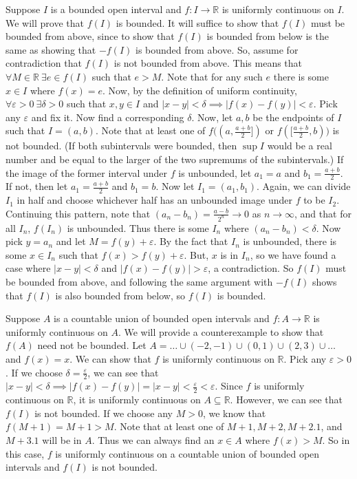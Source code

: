 \documentclass[11pt]{article}
\newcommand{\R}{\mathbb{R}}
\begin{document}
Suppose $I$ is a bounded open interval and $f:I\to\R$ is uniformly
continuous on $I$. We will prove that $f(I)$ is bounded. It will
suffice to show that $f(I)$ must be bounded from above, since to show
that $f(I)$ is bounded from below is the same as showing that
$-f(I)$ is bounded from above.
So, assume for contradiction that $f(I)$ is not bounded from above.
This means that $\forall M\in\R\ \exists e\in f(I)$ such that $e>M$.
Note that for any such $e$ there is some $x\in I$ where $f(x)=e$.
Now, by the definition of uniform continuity,
$\forall\varepsilon>0\ \exists\delta>0$ such that
$x,y\in I$ and $|x-y|<\delta\implies|f(x)-f(y)|<\varepsilon$.
Pick any $\varepsilon$ and fix it. Now find a corresponding $\delta$.
Now, let $a,b$ be the endpoints of $I$ such that $I=(a,b)$. Note that
at least one of $f((a,\frac{a+b}{2}])$ or $f([\frac{a+b}{2},b))$ is
not bounded. (If both subintervals were bounded, then $\sup I$ would
be a real number
and be equal to the larger of the two supremums of the subintervals.)
If the image of the former interval under $f$ is unbounded,
let $a_1=a$ and $b_1=\frac{a+b}{2}$.
If not, then let $a_1=\frac{a+b}{2}$ and $b_1=b$. Now let $I_1=(a_1,b_1)$.
Again, we can divide $I_1$ in half and choose whichever half has an unbounded
image under $f$
to be $I_2$. Continuing this pattern, note that $(a_n-b_n)=\frac{a-b}{2^n}\to0$
as $n\to\infty$, and that for all $I_n$, $f(I_n)$ is unbounded.
Thus there is some $I_n$ where $(a_n-b_n)<\delta$. Now pick $y=a_n$ and let
$M=f(y)+\varepsilon$. By the fact that $I_n$ is unbounded, there is some
$x\in I_n$ such that $f(x)>f(y)+\varepsilon$. But, $x$ is in $I_n$,
so we have found a case where $|x-y|<\delta$ and 
$|f(x)-f(y)|>\varepsilon$, a contradiction. So $f(I)$ must be bounded from
above, and following the same argument with $-f(I)$ shows that
$f(I)$ is also bounded from below, so $f(I)$ is bounded.

Suppose $A$ is a countable union of bounded open intervals and $f:A\to\R$
is uniformly continuous on $A$. We will provide a counterexample to show
that $f(A)$ need not be bounded. Let
$A=\ldots\cup (-2, -1) \cup (0, 1) \cup (2, 3) \cup\ldots$ and $f(x)=x$.
We can show that $f$ is uniformly continuous on $\R$. Pick any $\varepsilon>0$.
If we choose $\delta=\frac{\varepsilon}{2}$, we can see that $|x-y|<\delta
\implies |f(x)-f(y)|=|x-y|<\frac{\varepsilon}{2}<\varepsilon$. Since
$f$ is uniformly continuous on $\R$, it is uniformly continuous on
$A\subseteq\R$. However, we can see that $f(I)$ is not bounded. If we
choose any $M>0$, we know that $f(M+1)=M+1>M$. Note that
at least one of $M+1, M+2, M+2.1$, and $M+3.1$ will be in $A$. Thus we
can always find an $x\in A$ where $f(x)>M$. So in this case, 
$f$ is uniformly continuous on a countable union of bounded open intervals
and $f(I)$ is not bounded.
\end{document}
